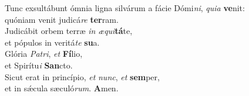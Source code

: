 \evenverse Tunc exsultábunt ómnia ligna silvárum a fácie Dómi\textit{ni}, \textit{qui}\textit{a} \textbf{ve}nit:~\*\\
\evenverse quóniam venit judicá\textit{re} \textbf{ter}ram.\\
\oddverse Judicábit orbem terræ \textit{in} \textit{æ}\textit{qui}\textbf{tá}te,~\*\\
\oddverse et pópulos in veritá\textit{te} \textbf{su}a.\\
\evenverse Glória \textit{Pa}\textit{tri}, \textit{et} \textbf{Fí}lio,~\*\\
\evenverse et Spirítu\textit{i} \textbf{San}cto.\\
\oddverse Sicut erat in princípio, \textit{et} \textit{nunc}, \textit{et} \textbf{sem}per,~\*\\
\oddverse et in sǽcula sæculó\textit{rum}. \textbf{A}men.\\
